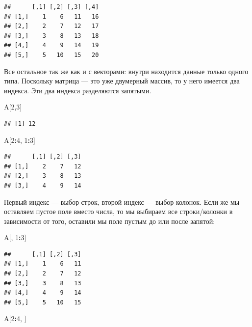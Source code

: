 \documentclass[]{book}
\newenvironment{Shaded}{\begin{snugshade}}{\end{snugshade}}
\newcommand{\DecValTok}[1]{\textcolor[rgb]{0.00,0.00,0.81}{#1}}
\newcommand{\OperatorTok}[1]{\textcolor[rgb]{0.81,0.36,0.00}{\textbf{#1}}}
\newcommand{\NormalTok}[1]{#1}
\begin{document}
\begin{verbatim}
##      [,1] [,2] [,3] [,4]
## [1,]    1    6   11   16
## [2,]    2    7   12   17
## [3,]    3    8   13   18
## [4,]    4    9   14   19
## [5,]    5   10   15   20
\end{verbatim}

Все остальное так же как и с векторами: внутри находится данные только
одного типа. Поскольку матрица --- это уже двумерный массив, то у него
имеется два индекса. Эти два индекса разделяются запятыми.

\begin{Shaded}
\begin{Highlighting}[]
\NormalTok{A[}\DecValTok{2}\NormalTok{,}\DecValTok{3}\NormalTok{]}
\end{Highlighting}
\end{Shaded}

\begin{verbatim}
## [1] 12
\end{verbatim}

\begin{Shaded}
\begin{Highlighting}[]
\NormalTok{A[}\DecValTok{2}\OperatorTok{:}\DecValTok{4}\NormalTok{, }\DecValTok{1}\OperatorTok{:}\DecValTok{3}\NormalTok{]}
\end{Highlighting}
\end{Shaded}

\begin{verbatim}
##      [,1] [,2] [,3]
## [1,]    2    7   12
## [2,]    3    8   13
## [3,]    4    9   14
\end{verbatim}

Первый индекс --- выбор строк, второй индекс --- выбор колонок. Если же
мы оставляем пустое поле вместо числа, то мы выбираем все строки/колонки
в зависимости от того, оставили мы поле пустым до или после запятой:

\begin{Shaded}
\begin{Highlighting}[]
\NormalTok{A[, }\DecValTok{1}\OperatorTok{:}\DecValTok{3}\NormalTok{]}
\end{Highlighting}
\end{Shaded}

\begin{verbatim}
##      [,1] [,2] [,3]
## [1,]    1    6   11
## [2,]    2    7   12
## [3,]    3    8   13
## [4,]    4    9   14
## [5,]    5   10   15
\end{verbatim}

\begin{Shaded}
\begin{Highlighting}[]
\NormalTok{A[}\DecValTok{2}\OperatorTok{:}\DecValTok{4}\NormalTok{, ]}
\end{Highlighting}
\end{Shaded}
\end{document}
